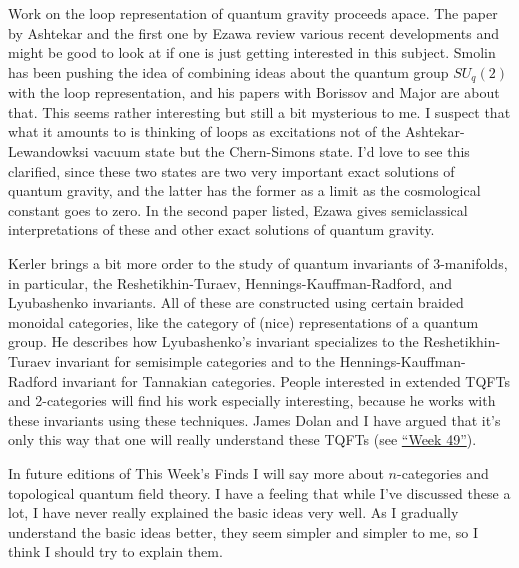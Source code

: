 \documentclass{article}
\def\tightlist{}
\renewcommand{\texttt}[1]{%
  \begingroup
  \ttfamily
  \begingroup\lccode`~=`/\lowercase{\endgroup\def~}{/\discretionary{}{}{}}%
  \begingroup\lccode`~=`[\lowercase{\endgroup\def~}{[\discretionary{}{}{}}%
  \begingroup\lccode`~=`.\lowercase{\endgroup\def~}{.\discretionary{}{}{}}%
  \catcode`/=\active\catcode`[=\active\catcode`.=\active
  \scantokens{#1\noexpand}%
  \endgroup
}
\begin{document}
Work on the loop representation of quantum gravity proceeds apace. The
paper by Ashtekar and the first one by Ezawa review various recent
developments and might be good to look at if one is just getting
interested in this subject. Smolin has been pushing the idea of
combining ideas about the quantum group \(SU_q(2)\) with the loop
representation, and his papers with Borissov and Major are about that.
This seems rather interesting but still a bit mysterious to me. I
suspect that what it amounts to is thinking of loops as excitations not
of the Ashtekar-Lewandowksi vacuum state but the Chern-Simons state. I'd
love to see this clarified, since these two states are two very
important exact solutions of quantum gravity, and the latter has the
former as a limit as the cosmological constant goes to zero. In the
second paper listed, Ezawa gives semiclassical interpretations of these
and other exact solutions of quantum gravity.


Kerler brings a bit more order to the study of quantum invariants of
3-manifolds, in particular, the Reshetikhin-Turaev,
Hennings-Kauffman-Radford, and Lyubashenko invariants. All of these are
constructed using certain braided monoidal categories, like the category
of (nice) representations of a quantum group. He describes how
Lyubashenko's invariant specializes to the Reshetikhin-Turaev invariant
for semisimple categories and to the Hennings-Kauffman-Radford invariant
for Tannakian categories. People interested in extended TQFTs and
2-categories will find his work especially interesting, because he works
with these invariants using these techniques. James Dolan and I have
argued that it's only this way that one will really understand these
TQFTs (see \protect\hyperlink{week49}{``Week 49''}).

In future editions of This Week's Finds I will say more about
\(n\)-categories and topological quantum field theory. I have a feeling
that while I've discussed these a lot, I have never really explained the
basic ideas very well. As I gradually understand the basic ideas better,
they seem simpler and simpler to me, so I think I should try to explain
them.
\end{document}
